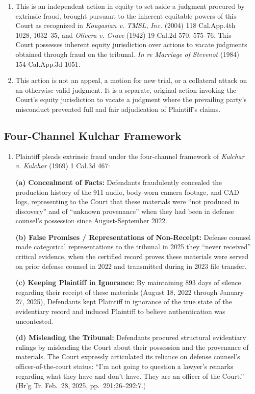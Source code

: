 \begin{enumerate}
\def\labelenumi{\arabic{enumi}.}
\item
  This is an independent action in equity to set aside a judgment procured by extrinsic fraud, brought pursuant to the inherent equitable powers of this Court as recognized in \emph{Kougasian v. TMSL, Inc.} (2004) 118 Cal.App.4th 1028, 1032--35, and \emph{Olivera v. Grace} (1942) 19 Cal.2d 570, 575--76. This Court possesses inherent equity jurisdiction over actions to vacate judgments obtained through fraud on the tribunal. \emph{In re Marriage of Stevenot} (1984) 154 Cal.App.3d 1051.
\item
  This action is not an appeal, a motion for new trial, or a collateral attack on an otherwise valid judgment. It is a separate, original action invoking the Court's equity jurisdiction to vacate a judgment where the prevailing party's misconduct prevented full and fair adjudication of Plaintiff's claims.
\end{enumerate}

\subsection{Four-Channel Kulchar Framework}\label{four-channel-kulchar-framework}

\begin{enumerate}
\def\labelenumi{\arabic{enumi}.}
\setcounter{enumi}{2}
\item
  Plaintiff pleads extrinsic fraud under the four-channel framework of \emph{Kulchar v. Kulchar} (1969) 1 Cal.3d 467:

  \textbf{(a) Concealment of Facts:} Defendants fraudulently concealed the production history of the 911 audio, body-worn camera footage, and CAD logs, representing to the Court that these materials were ``not produced in discovery'' and of ``unknown provenance'' when they had been in defense counsel's possession since August-September 2022.

  \textbf{(b) False Promises / Representations of Non-Receipt:} Defense counsel made categorical representations to the tribunal in 2025 they ``never received'' critical evidence, when the certified record proves these materials were served on prior defense counsel in 2022 and transmitted during in 2023 file transfer.

  \textbf{(c) Keeping Plaintiff in Ignorance:} By maintaining 893 days of silence regarding their receipt of these materials (August 18, 2022 through January 27, 2025), Defendants kept Plaintiff in ignorance of the true state of the evidentiary record and induced Plaintiff to believe authentication was uncontested.

  \textbf{(d) Misleading the Tribunal:} Defendants procured structural evidentiary rulings by misleading the Court about their possession and the provenance of materials. The Court expressly articulated its reliance on defense counsel's officer-of-the-court status: ``I'm not going to question a lawyer's remarks regarding what they have and don't have. They are an officer of the Court.'' (Hr'g Tr. Feb.~28, 2025, pp.~291:26--292:7.)
\end{enumerate}

